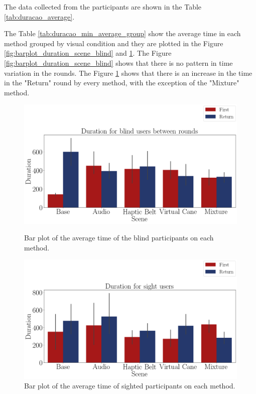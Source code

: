
The data collected from the participants are shown in the Table \ref{tab:duracao_average}.



The Table \ref{tab:duracao_min_average_group} show the average time in each method grouped by visual condition and they are plotted in the Figure \ref{fig:barplot_duration_scene_blind} and \ref{fig:barplot_duration_scene_sight}. The Figure \ref{fig:barplot_duration_scene_blind} shows that there is no pattern in time variation in the rounds. The Figure \ref{fig:barplot_duration_scene_sight} shows that there is an increase in the time in the "Return" round by every method, with the exception of the "Mixture" method. 

%



\begin{figure}[!htb]
    \centering
    \begin{minipage}{\textwidth}
        \centering
        \includegraphics[width = 0.8\linewidth]{Resultados/Tempo/Figuras/png/barplot_duration_scene_blind.png}
        \caption{Bar plot of the average time of the blind participants on each method.}
        \label{fig:barplot_duration_scene_blind}
    \end{minipage}
    \begin{minipage}{\textwidth}
        \centering
        \includegraphics[width = 0.8\linewidth]{Resultados/Tempo/Figuras/png/barplot_duration_scene_sight.png}
        \caption{Bar plot of the average time of sighted participants on each method.}
        \label{fig:barplot_duration_scene_sight}
    \end{minipage}
\end{figure}


